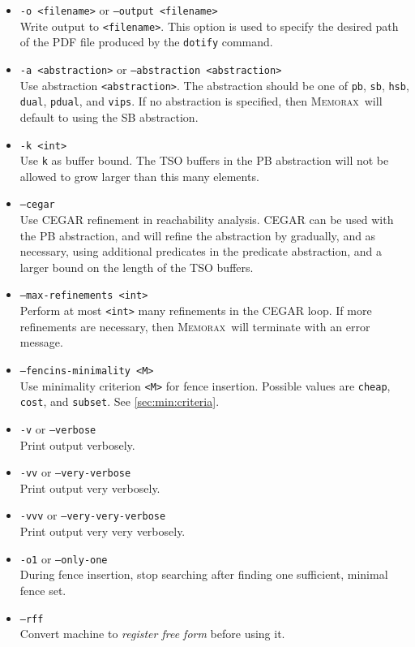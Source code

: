 \documentclass[a4paper]{article}
\newcommand{\memorax}{\textsc{Memorax}}
\begin{document}
\begin{itemize}
\item {\tt -o <filename>} or {\tt --output <filename>}\\ Write output
  to {\tt <filename>}. This option is used to specify the desired path
  of the PDF file produced by the {\tt dotify} command.

\item {\tt -a <abstraction>} or {\tt --abstraction <abstraction>}
  \\ Use abstraction {\tt <abstraction>}. The abstraction should be
  one of {\tt pb}, {\tt sb}, {\tt hsb}, {\tt dual}, {\tt pdual}, and {\tt vips}. If no abstraction is specified, then
  \memorax\ will default to using the SB abstraction.

\item {\tt -k <int>}\\ Use {\tt k} as buffer bound. The TSO buffers in
  the PB abstraction will not be allowed to grow larger than this many
  elements.

\item {\tt --cegar}\\ Use CEGAR refinement in reachability
  analysis. CEGAR can be used with the PB abstraction, and will refine
  the abstraction by gradually, and as necessary, using additional
  predicates in the predicate abstraction, and a larger bound on the
  length of the TSO buffers.

\item {\tt --max-refinements <int>}\\ Perform at most {\tt <int>} many
  refinements in the CEGAR loop. If more refinements are necessary,
  then \memorax\ will terminate with an error message.

\item {\tt --fencins-minimality <M>}\\
%
  Use minimality criterion {\tt <M>} for fence insertion. Possible
  values are {\tt cheap}, {\tt cost}, and {\tt subset}. See
  \cref{sec:min:criteria}.

\item {\tt -v} or {\tt --verbose}\\
  Print output verbosely.
\item {\tt -vv} or {\tt --very-verbose}\\
  Print output very verbosely.
\item {\tt -vvv} or {\tt --very-very-verbose}\\
  Print output very very verbosely.
\item {\tt -o1} or {\tt --only-one}\\
  During fence insertion, stop searching after finding one sufficient, minimal fence set.
\item {\tt --rff}\\
  Convert machine to \emph{register free form}
  before using it. \explainrff
\end{itemize}
\end{document}
